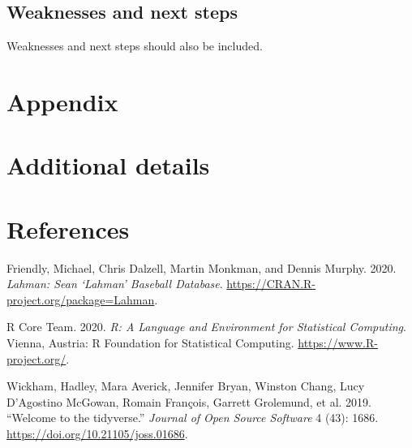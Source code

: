 \documentclass[
]{article}
\newlength{\cslhangindent}
\newlength{\cslentryspacingunit} %
\newenvironment{CSLReferences}[2] %
 {%
  \setlength{\parindent}{0pt}
  \ifodd #1
  \let\oldpar\par
  \def\par{\hangindent=\cslhangindent\oldpar}
  \fi
  \setlength{\parskip}{#2\cslentryspacingunit}
 }%
 {}
\begin{document}
\hypertarget{weaknesses-and-next-steps}{%
\subsection{Weaknesses and next steps}\label{weaknesses-and-next-steps}}

Weaknesses and next steps should also be included.

\newpage

\appendix

\hypertarget{appendix}{%
\section*{Appendix}\label{appendix}}

\hypertarget{additional-details}{%
\section{Additional details}\label{additional-details}}

\newpage

\hypertarget{references}{%
\section*{References}\label{references}}

\hypertarget{refs}{}
\begin{CSLReferences}{1}{0}
\leavevmode{}%
Friendly, Michael, Chris Dalzell, Martin Monkman, and Dennis Murphy. 2020. \emph{Lahman: Sean {`Lahman'} Baseball Database}. \url{https://CRAN.R-project.org/package=Lahman}.

\leavevmode{}%
R Core Team. 2020. \emph{R: A Language and Environment for Statistical Computing}. Vienna, Austria: R Foundation for Statistical Computing. \url{https://www.R-project.org/}.

\leavevmode{}%
Wickham, Hadley, Mara Averick, Jennifer Bryan, Winston Chang, Lucy D'Agostino McGowan, Romain François, Garrett Grolemund, et al. 2019. {``Welcome to the {tidyverse}.''} \emph{Journal of Open Source Software} 4 (43): 1686. \url{https://doi.org/10.21105/joss.01686}.

\end{CSLReferences}
\end{document}
